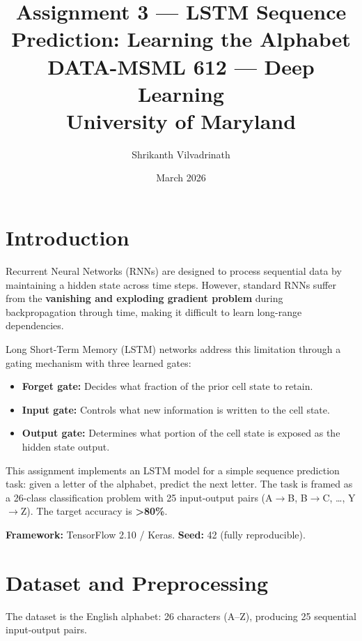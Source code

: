 \documentclass[12pt,a4paper]{article}
\title{%
  \textbf{Assignment 3 --- LSTM Sequence Prediction: Learning the Alphabet}\\[6pt]
  \large DATA-MSML 612 --- Deep Learning\\
  University of Maryland
}
\author{Shrikanth Vilvadrinath}
\date{March 2026}
\begin{document}
\maketitle
\tableofcontents
\newpage

\section{Introduction}

Recurrent Neural Networks (RNNs) are designed to process sequential data by maintaining
a hidden state across time steps. However, standard RNNs suffer from the
\textbf{vanishing and exploding gradient problem} during backpropagation through time,
making it difficult to learn long-range dependencies.

Long Short-Term Memory (LSTM) networks \cite{hochreiter1997} address this limitation
through a gating mechanism with three learned gates:
\begin{itemize}
  \item \textbf{Forget gate:} Decides what fraction of the prior cell state to retain.
  \item \textbf{Input gate:} Controls what new information is written to the cell state.
  \item \textbf{Output gate:} Determines what portion of the cell state is exposed as the
        hidden state output.
\end{itemize}

This assignment implements an LSTM model for a simple sequence prediction task: given a
letter of the alphabet, predict the next letter. The task is framed as a 26-class
classification problem with 25 input-output pairs (A$\to$B, B$\to$C, \ldots, Y$\to$Z).
The target accuracy is \textbf{>80\%}.

\textbf{Framework:} TensorFlow 2.10 / Keras. \textbf{Seed:} 42 (fully reproducible).

\section{Dataset and Preprocessing}

The dataset is the English alphabet: 26 characters (A--Z), producing 25 sequential
input-output pairs.
\end{document}
